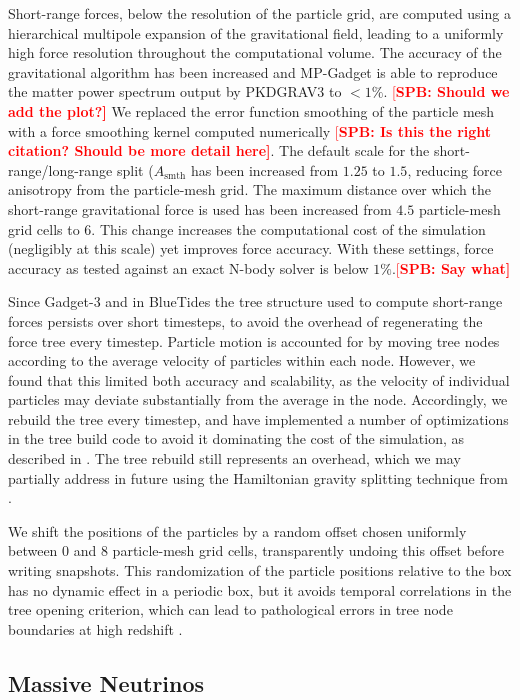 \documentclass[fleqn,usenatbib]{mnras}
\newcommand{\spb}[1]{\textcolor{red}{[\bf SPB: #1]}}
\begin{document}
Short-range forces, below the resolution of the particle grid, are computed using a hierarchical multipole expansion of the gravitational field, leading to a uniformly high force resolution throughout the computational volume. The accuracy of the gravitational algorithm has been increased and MP-Gadget is able to reproduce the matter power spectrum output by PKDGRAV3 \cite{Schneider:2016} to $<1\%$. \spb{Should we add the plot?} We replaced the error function smoothing of the particle mesh with a force smoothing kernel computed numerically \cite{Heitmann:2016} \spb{Is this the right citation? Should be more detail here}. The default scale for the short-range/long-range split ($A_\mathrm{smth}$ has been increased from $1.25$ to $1.5$, reducing force anisotropy from the particle-mesh grid. The maximum distance over which the short-range gravitational force is used has been increased from $4.5$ particle-mesh grid cells to $6$. This change increases the computational cost of the simulation (negligibly at this scale) yet improves force accuracy. With these settings, force accuracy as tested against an exact N-body solver is below $1\%$.\spb{Say what}

Since Gadget-3 and in BlueTides the tree structure used to compute short-range forces persists over short timesteps, to avoid the overhead of regenerating the force tree every timestep.
Particle motion is accounted for by moving tree nodes according to the average velocity of particles within each node. However, we found that this limited both accuracy and scalability, as the velocity of individual particles may deviate substantially from the average in the node. Accordingly, we rebuild the tree every timestep, and have implemented a number of optimizations in the tree build code to avoid it dominating the cost of the simulation, as described in \cite{Bird:2018}. The tree rebuild still represents an overhead, which we may partially address in future using the Hamiltonian gravity splitting technique from \cite{2020arXiv201003567S}.

We shift the positions of the particles by a random offset chosen uniformly between $0$ and $8$ particle-mesh grid cells, transparently undoing this offset before writing snapshots. This randomization of the particle positions relative to the box has no dynamic effect in a periodic box, but it avoids temporal correlations in the tree opening criterion, which can lead to pathological errors in tree node boundaries at high redshift \cite{2020arXiv201003567S}.

\subsection{Massive Neutrinos}
\end{document}
